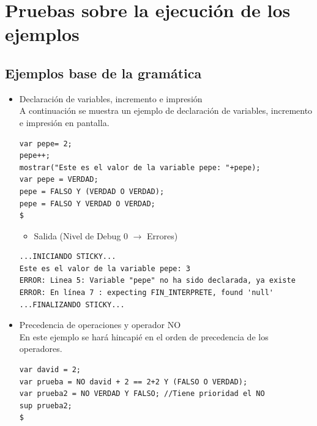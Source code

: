 \documentclass[a4paper, 12pt]{book}
\begin{document}
\section{Pruebas sobre la ejecución de los ejemplos}

\subsection{Ejemplos base de la gramática}

\begin{itemize}
  
\item Declaración de variables, incremento e impresión\\

  
  A continuación se muestra un ejemplo de declaración de variables, incremento e impresión en pantalla. \\
  
  
\begin{verbatim}
var pepe= 2;
pepe++;
mostrar("Este es el valor de la variable pepe: "+pepe);
var pepe = VERDAD;
pepe = FALSO Y (VERDAD O VERDAD);
pepe = FALSO Y VERDAD O VERDAD;
$
\end{verbatim}
  
  
  
\begin{itemize}
\item Salida (Nivel de Debug 0 $\rightarrow$ Errores)
\end{itemize}
\begin{verbatim}
...INICIANDO STICKY...
Este es el valor de la variable pepe: 3
ERROR: Linea 5: Variable "pepe" no ha sido declarada, ya existe
ERROR: En línea 7 : expecting FIN_INTERPRETE, found 'null'
...FINALIZANDO STICKY...
\end{verbatim}




\item Precedencia de operaciones y operador NO\\
  

  En este ejemplo se hará hincapié en el orden de precedencia de los operadores. \\
  
  
\begin{verbatim}
var david = 2;
var prueba = NO david + 2 == 2+2 Y (FALSO O VERDAD);
var prueba2 = NO VERDAD Y FALSO; //Tiene prioridad el NO
sup prueba2;
$
\end{verbatim}
  
  
  

\end{itemize}
\end{document}
